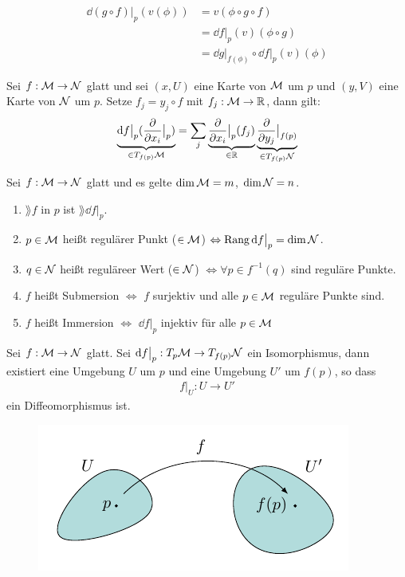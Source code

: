 \begin{bew} \leavevmode
\begin{align}
\dd (g \circ f) \big\vert_{p} (v (\phi)) &= v(\phi \circ g \circ f) \\
&= \dd f \big\vert_p (v)(\phi \circ g) \\
&= \dd g \big\vert_{f(\phi)} \circ \dd f \big\vert_p (v) (\phi)
\end{align}
\end{bew}

\begin{satz}
Sei $f: \mathcal{M} \to \mathcal{N}$ glatt und sei $(x, U)$ eine Karte von $\mathcal{M}$ um $p$ und $(y, V)$ eine Karte von $\mathcal{N}$ um $p$.
Setze $f_j = y_j \circ f$ mit $f_j : \mathcal{M} \to \mathbb{R}$, dann gilt:
\begin{align}
\underbrace{\dd f \big\vert_p ( \pdv{x_i} \big\vert_p)}_{\in T_{f(p)}\mathcal{M}} = \sum_j \underbrace{\pdv{x_i}\big\vert_p (f_j)}_{\in \mathbb{R}} \underbrace{\pdv{y_j} \big\vert_{f(p)}}_{\in T_{f(p)}\mathcal{N}}
\end{align}
\end{satz}

\begin{defs} 
Sei $f: \mathcal{M} \to \mathcal{N}$ glatt und es gelte $\dim\mathcal{M}=m$, $\dim{\mathcal{N}} = n$.
\begin{enumerate}
\item $\rang f$ in $p$ ist $\rang \dd f \big \vert_p $.
\item $p\in\mathcal{M}$ heißt regulärer Punkt ($\in\mathcal{M}$)  $\Leftrightarrow \operatorname{Rang}\dd f \big\vert_p=\dim\mathcal{N}$.
\item $q\in\mathcal{N}$ heißt reguläreer Wert ($\in\mathcal{N}$) $\Leftrightarrow \forall p \in f	^{-1}(q)$ sind reguläre Punkte.
\item $f$ heißt Submersion $\Leftrightarrow$ $f$ surjektiv und alle $p\in\mathcal{M}$ reguläre Punkte sind.
\item $f$ heißt Immersion $\Leftrightarrow$ $\dd f \big\vert_p$ injektiv für alle $p \in \mathcal{M}$
\end{enumerate}
\end{defs}

\begin{satz}[Umkehrsatz]
\label{satz:Umkehrsatz}
Sei $f: \mathcal{M} \to \mathcal{N}$ glatt. 
Sei $\dd f \big\vert_p : T_{p} \mathcal{M} \to T_{f(p)}\mathcal{N}$ ein Isomorphismus,
dann existiert eine Umgebung $U$ um $p$ und eine Umgebung $U'$ um $f(p)$, so dass
\begin{align}
f\big\vert_U : U \to U'
\end{align}
ein Diffeomorphismus ist.
\begin{figure}[H]
\centering
\includegraphics[width=0.5\linewidth]{figures/tikz/inverse_function_theorem.pdf}
\label{img:umkehrsatz}
\end{figure} 
\end{satz}

